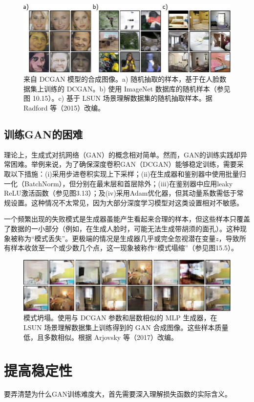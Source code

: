 \documentclass[lang=cn,newtx,10pt,scheme=chinese]{elegantbook}
\begin{document}
\begin{figure}[ht!]
\centering
\includegraphics[width=0.7\linewidth]{PDFFigures/UDLChap15PDF/GANDCGANResults.pdf}
\caption{来自 DCGAN 模型的合成图像。a) 随机抽取的样本，基于在人脸数据集上训练的 DCGAN。b) 使用 ImageNet 数据库的随机样本（参见图 10.15）。c) 基于 LSUN 场景理解数据集的随机抽取样本。据 Radford 等（2015）改编。}
\end{figure}

\subsection{训练GAN的困难}
理论上，生成式对抗网络（GAN）的概念相对简单。然而，GAN的训练实践却异常困难。举例来说，为了确保深度卷积GAN（DCGAN）能够稳定训练，需要采取以下措施：(i)采用步进卷积实现上下采样；(ii)在生成器和鉴别器中使用批量归一化（BatchNorm），但分别在最末层和首层除外；(iii)在鉴别器中应用leaky ReLU激活函数（参见图3.13）；及(iv)采用Adam优化器，但其动量系数需低于常规设置。这种情况不太常见，因为大部分深度学习模型对这类设置相对不敏感。

一个频繁出现的失败模式是生成器虽能产生看起来合理的样本，但这些样本只覆盖了数据的一小部分（例如，在生成人脸时，可能无法生成带胡须的面孔）。这种现象被称为“模式丢失”。更极端的情况是生成器几乎或完全忽视潜在变量\(z\)，导致所有样本收敛至一个或少数几个点，这一现象被称作“模式塌缩”（参见图15.5）。

\begin{figure}[ht!]
\centering
\includegraphics[width=0.7\linewidth]{PDFFigures/UDLChap15PDF/GANModeCollapse.pdf}
\caption{模式坍塌。使用与 DCGAN 参数和层数相似的 MLP 生成器，在 LSUN 场景理解数据集上训练得到的 GAN 合成图像。这些样本质量低，且多数相似。根据 Arjovsky 等（2017）改编。}
\end{figure}


\section{提高稳定性}
要弄清楚为什么GAN训练难度大，首先需要深入理解损失函数的实际含义。
\end{document}
